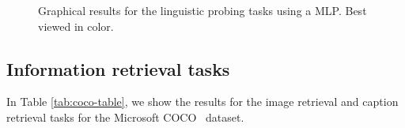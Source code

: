 \documentclass{article}
\begin{document}
\begin{figure}[!htb]
\caption{Graphical results for the linguistic probing tasks using a MLP. Best viewed in color.}
\label{fig:downstream-probing-tasks}
\end{figure}

\subsection{Information retrieval tasks}
In Table \ref{tab:coco-table}, we show the results for the image retrieval and caption retrieval tasks for the Microsoft COCO~\cite{lin2014microsoft} dataset.


\begin{table}[!htb]
  \caption{Results for the image retrieval and caption retrieval tasks using the Microsoft COCO~\cite{lin2014microsoft} dataset and features extracted with a ResNet-101~\cite{he2016deep}. In this table we present Recall at 1 (R@1), Recall at 5 (R@5) and so on, as well as the median.}
  \label{tab:coco-table}
  \centering
\end{table}
\end{document}
